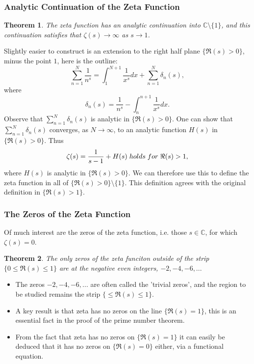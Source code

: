 \documentclass{article}
\newtheorem{theorem}{Theorem}[section]
\begin{document}
\subsubsection{Analytic Continuation of the Zeta Function}
\begin{theorem}
The zeta function has an analytic continuation into $\mathbb{C} \setminus \{1\}$, and this continuation satisfies that $\zeta (s) \to \infty$ as $s \to 1$.
\end{theorem}
Slightly easier to construct is an extension to the right half plane $\{ \Re (s) > 0\}$, minus the point $1$, here is the outline: \\
\begin{equation*}
\sum_{n=1}^{N} \frac{1}{n^s} = \int_{1}^{N+1} \frac{1}{x^s}dx + \sum_{n=1}^{N}\delta_n (s),
\end{equation*}
where
\begin{equation*}
\delta_n (s) = \frac{1}{n^s} - \int_n^{n+1} \frac{1}{x^s}dx.
\end{equation*}
Observe that $\sum_{n=1}^{N} \delta_n(s)$ is analytic in $\{ \Re (s) > 0\}$. One can show that $\sum_{n=1}^{N}\delta_n(s)$ converges, as $N \to \infty$, to an analytic function $H(s)$ in $\{ \Re (s) > 0\}$. Thus
\begin{equation*}
\zeta (s) = \frac{1}{s-1} + H(s) \hspace{0.1cm} holds \hspace{0.1cm} for \hspace{0.1cm} \Re (s) > 1,
\end{equation*}
where $H(s)$ is analytic in $\{ \Re (s) > 0 \}$. We can therefore use this to define the zeta function in all of $\{ \Re (s) > 0 \} \setminus \{1\}$. This definition agrees with the original definition in $\{ \Re (s) > 1 \}$. 

\subsubsection{The Zeros of the Zeta Function}
Of much interest are the zeros of the zeta function, i.e. those $s \in \mathbb{C}$, for which $\zeta(s) = 0$. 
\begin{theorem}
The only zeros of the zeta funciton outside of the strip $\{ 0 \leq \Re (s) \leq 1 \}$ are at the negative even integers, $-2, -4, -6, ...$
\end{theorem}
\begin{itemize}
\item The zeros $-2, -4, -6, ...$ are often called the 'trivial zeros', and the region to be studied remains the strip $\{ \leq \Re (s) \leq 1 \}$.
\item A key result is that zeta has no zeros on the line $\{ \Re (s) = 1 \}$, this is an essential fact in the proof of the prime number theorem.
\item From the fact that zeta has no zeros on $\{ \Re (s) = 1 \}$ it can easily be deduced that it has no zeros on $\{ \Re (s) = 0 \}$ either, via a functional equation.
\end{itemize}
\end{document}
